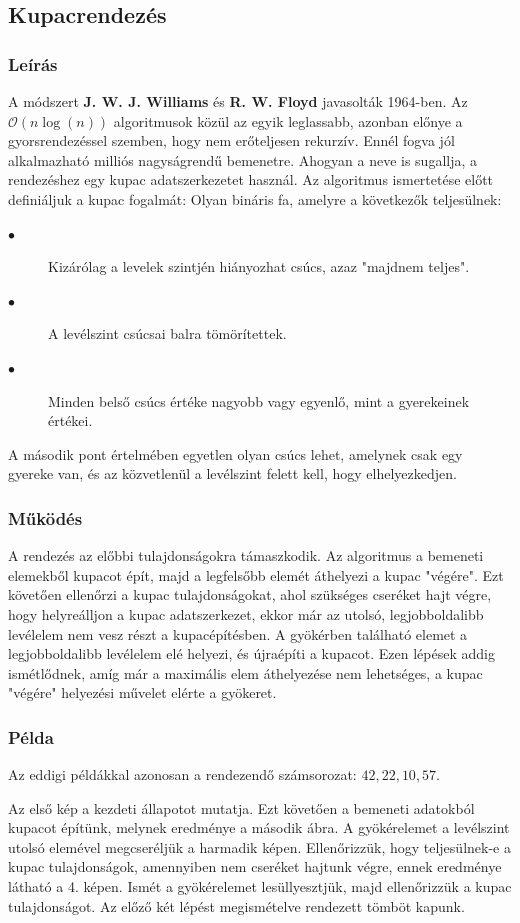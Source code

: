 \documentclass{elteikthesis}
\newcommand{\hiddensubsubsection}[1]{
	\stepcounter{subsubsection}
	\subsubsection*{{#1}}	
}
\begin{document}
\subsection{Kupacrendezés}
\hiddensubsubsection{Leírás}
A módszert \textbf{J. W. J. Williams} és \textbf{R. W. Floyd} javasolták 1964-ben\cite{Ronyai}.
Az $\mathcal{O}(n\log (n))$ algoritmusok közül az egyik leglassabb, azonban előnye a gyorsrendezéssel szemben, hogy nem erőteljesen rekurzív. Ennél fogva jól alkalmazható milliós nagyságrendű bemenetre. Ahogyan a neve is sugallja, a rendezéshez egy kupac adatszerkezetet használ. Az algoritmus ismertetése előtt definiáljuk a kupac fogalmát\cite{Fekete}:
Olyan bináris fa, amelyre a következők teljesülnek:
\begin{description}
	\item[$\bullet$] Kizárólag a levelek szintjén hiányozhat csúcs, azaz "majdnem teljes".
	\item[$\bullet$] A levélszint csúcsai balra tömörítettek.
	\item[$\bullet$] Minden belső csúcs értéke nagyobb vagy egyenlő, mint a gyerekeinek értékei.
\end{description}
A második pont értelmében egyetlen olyan csúcs lehet, amelynek csak egy gyereke van, és az közvetlenül a levélszint felett kell, hogy elhelyezkedjen.\par
\hiddensubsubsection{Működés}
A rendezés az előbbi tulajdonságokra támaszkodik. 
Az algoritmus a bemeneti elemekből kupacot épít, majd a legfelsőbb elemét áthelyezi a kupac "végére". Ezt követően ellenőrzi a kupac tulajdonságokat, ahol szükséges cseréket hajt végre, hogy helyreálljon a kupac adatszerkezet, ekkor már az utolsó, legjobboldalibb levélelem nem vesz részt a kupacépítésben. A gyökérben található elemet a legjobboldalibb levélelem elé helyezi, és újraépíti a kupacot. Ezen lépések addig ismétlődnek, amíg már a maximális elem áthelyezése nem lehetséges, a kupac "végére" helyezési művelet elérte a gyökeret.\par
 \hiddensubsubsection{Példa}
 Az eddigi példákkal azonosan a rendezendő számsorozat: $42, 22, 10, 57$.\par
 Az első kép a kezdeti állapotot mutatja. Ezt követően a bemeneti adatokból kupacot építünk, melynek eredménye a második ábra. A gyökérelemet a levélszint utolsó elemével megcseréljük a harmadik képen. Ellenőrizzük, hogy teljesülnek-e a kupac tulajdonságok, amennyiben nem cseréket hajtunk végre, ennek eredménye látható a 4. képen. Ismét a gyökérelemet lesüllyesztjük, majd ellenőrizzük a kupac tulajdonságot. Az előző két lépést megismételve rendezett tömböt kapunk.\par
\end{document}
